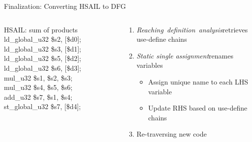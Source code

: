 \documentclass{beamer}
\begin{document}
\begin{CJK}{UTF8}{bkai}
            \begin{frame}{Finalization: Converting HSAIL to DFG}
                \vspace{-1em}
                \begin{columns}
                    \begin{column}{0.4\textwidth}
                        \begin{block}{HSAIL: sum of products}
                            ld\_global\_u32 \$s2, [\$d0]; \\ 
                            ld\_global\_u32 \$s3, [\$d1]; \\ 
                            ld\_global\_u32 \$s5, [\$d2]; \\
                            ld\_global\_u32 \$s6, [\$d3]; \\
                            mul\_u32 \$s1, \$s2, \$s3; \\
                            mul\_u32 \$s4, \$s5, \$s6; \\
                            add\_u32 \$s7, \$s1, \$s4; \\
                            st\_global\_u32 \$s7, [\$d4]; \\
                        \end{block} 
                    \end{column}
                    \begin{column}{0.6\textwidth}
                        \vspace{-0.5em}
                        \begin{enumerate}
                            \item <2->{\textit{Reaching~definition~analysis}\footnotemark retrieves use-define chains}
                            \item <3->{\textit{Static single assignment}\footnotemark renames variables
                                \begin{itemize}
                                    \item Assign unique name to each LHS variable
                                    \item Update RHS based on use-define chains
                                \end{itemize}
                            }
                        \item <4->{Re-traversing new code
}
\end{enumerate}
\end{column}
\end{columns}
\end{frame}
\end{CJK}
\end{document}
